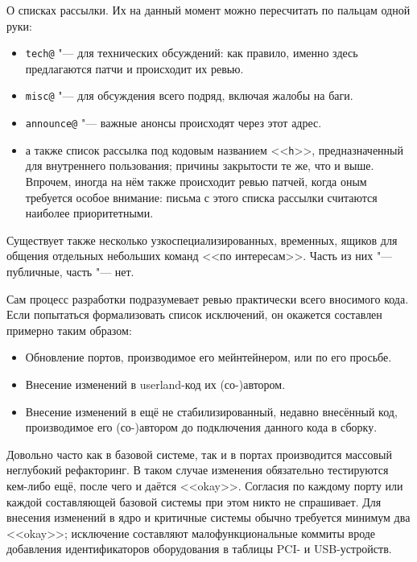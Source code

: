 \documentclass[10pt, a5paper]{article}
\begin{document}
О списках рассылки. Их на данный момент можно пересчитать по пальцам одной руки:
\begin{itemize}
  \item \verb!tech@! "--- для технических обсуждений: как правило, именно здесь предлагаются патчи и происходит их ревью.

  \item \verb!misc@! "--- для обсуждения всего подряд, включая жалобы на баги.

  \item \verb!announce@! "--- важные анонсы происходят через этот адрес.

  \item а также список рассылка под кодовым названием <<\verb!h!>>, предназначенный для внутреннего пользования; причины закрытости те же, что и выше. Впрочем, иногда на нём также происходит ревью патчей, когда оным требуется особое внимание: письма с этого списка рассылки считаются наиболее приоритетными.
\end{itemize}

Существует также несколько узкоспециализированных,  временных, ящиков для общения отдельных небольших команд <<по интересам>>. Часть из них "--- публичные, часть "--- нет.

Сам процесс разработки подразумевает ревью практически всего вносимого кода. Если попытаться формализовать список исключений, он окажется составлен примерно таким образом:

\begin{itemize}
  \item Обновление портов, производимое его мейнтейнером, или по его просьбе.

  \item Внесение изменений в userland-код их (со-)автором.

  \item Внесение изменений в ещё не стабилизированный, недавно внесённый код, производимое его (со-)автором до подключения данного кода в сборку.
\end{itemize}

Довольно часто как в базовой системе, так и в портах производится массовый неглубокий рефакторинг. В таком случае изменения обязательно тестируются кем-либо ещё, после чего и даётся <<okay>>. Согласия по каждому порту или каждой составляющей базовой системы при этом никто не спрашивает. Для внесения изменений в ядро и критичные системы обычно требуется минимум два <<okay>>; исключение составляют малофункциональные коммиты вроде добавления идентификаторов оборудования в таблицы PCI- и USB-устройств.
\end{document}
